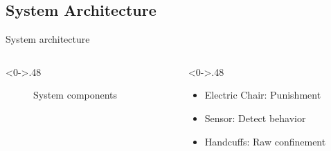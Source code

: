 \documentclass[10pt,aspectratio=43,mathserif]{beamer}
\begin{document}
\subsection{System Architecture}
\begin{frame}{System architecture}
\begin{columns}[T] %
\begin{column}<0->{.48\textwidth}
\begin{figure}[thpb]
\centering
{}
\caption{System components}
\label{fig:system}
\end{figure}
\end{column}%
\hfill%
\begin{column}<0->{.48\textwidth}
\begin{itemize}
\item Electric Chair: Punishment
\item Sensor: Detect behavior
\item Handcuffs: Raw confinement
\end{itemize}
\end{column}%
\end{columns}
\end{frame}
\end{document}
